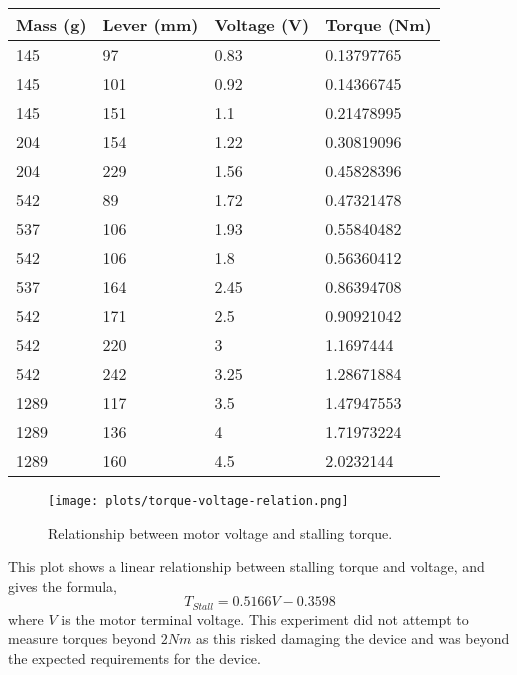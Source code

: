 \begin{table}[!ht]
	\label{voltage-torque-table}
	\centering
	\begin{tabular}{|l|l|l|l|}
		\hline
		Mass (g) & Lever (mm) & Voltage (V) & Torque (Nm) \\ \hline
		145 & 97 & 0.83 & 0.13797765 \\ \hline
		145 & 101 & 0.92 & 0.14366745 \\ \hline
		145 & 151 & 1.1 & 0.21478995 \\ \hline
		204 & 154 & 1.22 & 0.30819096 \\ \hline
		204 & 229 & 1.56 & 0.45828396 \\ \hline
		542 & 89 & 1.72 & 0.47321478 \\ \hline
		537 & 106 & 1.93 & 0.55840482 \\ \hline
		542 & 106 & 1.8 & 0.56360412 \\ \hline
		537 & 164 & 2.45 & 0.86394708 \\ \hline
		542 & 171 & 2.5 & 0.90921042 \\ \hline
		542 & 220 & 3 & 1.1697444 \\ \hline
		542 & 242 & 3.25 & 1.28671884 \\ \hline
		1289 & 117 & 3.5 & 1.47947553 \\ \hline
		1289 & 136 & 4 & 1.71973224 \\ \hline
		1289 & 160 & 4.5 & 2.0232144 \\ \hline
	\end{tabular}
\end{table}

\begin{figure}[!h]
	\centering
	\texttt{[image: plots/torque-voltage-relation.png]}
	\caption{Relationship between motor voltage and stalling torque.}
	\label{torque-voltage-plot}
\end{figure}

This plot shows a linear relationship between stalling torque and voltage, and gives the formula,
\begin{equation}
	T_{Stall} =  0.5166 V - 0.3598 \label{eqTorqueVoltage}
\end{equation}
where $V$ is the motor terminal voltage.
This experiment did not attempt to measure torques beyond $2 Nm$ as this risked damaging the device and was beyond the expected requirements for the device.



